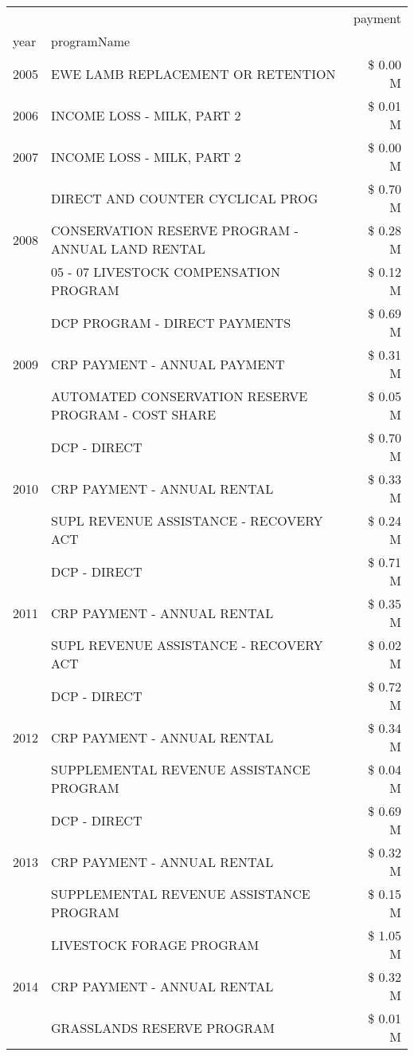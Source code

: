 \begin{tabular}{llr}
\toprule
 &  & payment \\
year & programName &  \\
\midrule
2005 & EWE LAMB REPLACEMENT OR RETENTION & \$ 0.00 M \\
\cline{1-3}
2006 & INCOME LOSS - MILK, PART 2 & \$ 0.01 M \\
\cline{1-3}
2007 & INCOME LOSS - MILK, PART 2 & \$ 0.00 M \\
\cline{1-3}
\multirow[t]{3}{*}{2008} & DIRECT AND COUNTER CYCLICAL PROG & \$ 0.70 M \\
 & CONSERVATION RESERVE PROGRAM - ANNUAL LAND RENTAL & \$ 0.28 M \\
 & 05 - 07 LIVESTOCK COMPENSATION PROGRAM & \$ 0.12 M \\
\cline{1-3}
\multirow[t]{3}{*}{2009} & DCP PROGRAM - DIRECT PAYMENTS & \$ 0.69 M \\
 & CRP PAYMENT - ANNUAL PAYMENT & \$ 0.31 M \\
 & AUTOMATED CONSERVATION RESERVE PROGRAM - COST SHARE & \$ 0.05 M \\
\cline{1-3}
\multirow[t]{3}{*}{2010} & DCP - DIRECT & \$ 0.70 M \\
 & CRP PAYMENT - ANNUAL RENTAL & \$ 0.33 M \\
 & SUPL REVENUE ASSISTANCE - RECOVERY ACT & \$ 0.24 M \\
\cline{1-3}
\multirow[t]{3}{*}{2011} & DCP - DIRECT & \$ 0.71 M \\
 & CRP PAYMENT - ANNUAL RENTAL & \$ 0.35 M \\
 & SUPL REVENUE ASSISTANCE - RECOVERY ACT & \$ 0.02 M \\
\cline{1-3}
\multirow[t]{3}{*}{2012} & DCP - DIRECT & \$ 0.72 M \\
 & CRP PAYMENT - ANNUAL RENTAL & \$ 0.34 M \\
 & SUPPLEMENTAL REVENUE ASSISTANCE PROGRAM & \$ 0.04 M \\
\cline{1-3}
\multirow[t]{3}{*}{2013} & DCP - DIRECT & \$ 0.69 M \\
 & CRP PAYMENT - ANNUAL RENTAL & \$ 0.32 M \\
 & SUPPLEMENTAL REVENUE ASSISTANCE PROGRAM & \$ 0.15 M \\
\cline{1-3}
\multirow[t]{3}{*}{2014} & LIVESTOCK FORAGE PROGRAM & \$ 1.05 M \\
 & CRP PAYMENT - ANNUAL RENTAL & \$ 0.32 M \\
 & GRASSLANDS RESERVE PROGRAM & \$ 0.01 M \\

\end{tabular}
